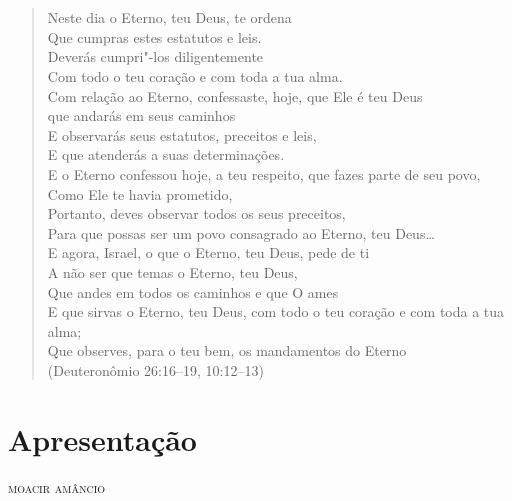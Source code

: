 \chapter*{}
\thispagestyle{empty}
\begin{verse}
Neste dia o Eterno, teu Deus, te ordena\\
Que cumpras estes estatutos e leis.\\
Deverás cumpri"-los diligentemente\\
Com todo o teu coração e com toda a tua alma.\\[10pt]

Com relação ao Eterno, confessaste, hoje, que Ele \qb{}é teu Deus\\
que andarás em seus caminhos\\
E observarás seus estatutos, preceitos e leis,\\
E que atenderás a suas determinações.\\[10pt]
 
E o Eterno confessou hoje, a teu respeito, que fazes \qb{}parte de seu povo,\\
Como Ele te havia prometido,\\
Portanto, deves observar todos os seus preceitos,\\
Para que possas ser um povo consagrado ao \qb{}Eterno, teu Deus\ldots{}\\[10pt]

E agora, Israel, o que o Eterno, teu Deus, pede de ti\\
A não ser que temas o Eterno, teu Deus,\\[10pt]

Que andes em todos os caminhos e que O ames\\
E que sirvas o Eterno, teu Deus, com todo o teu \qb{}coração e com toda a tua alma;\\
Que observes, para o teu bem, os mandamentos do \qb{}Eterno\\\bigskip
\hfill{}(Deuteronômio 26:16--19, 10:12--13) 
\end{verse}


\chapter[Apresentação, \emph{por Moacir Amâncio}]{Apresentação }

\begin{flushright}
\textsc{moacir amâncio}
\end{flushright}

